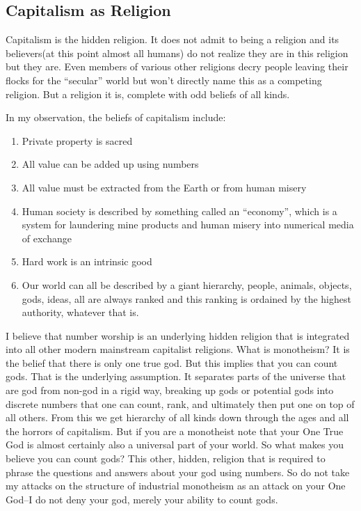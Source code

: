 \subsection{Capitalism as Religion}\label{capitalism-as-religion}

Capitalism is the hidden religion. It does not admit to being a religion
and its believers(at this point almost all humans) do not realize they
are in this religion but they are. Even members of various other
religions decry people leaving their flocks for the ``secular'' world
but won't directly name this as a competing religion. But a religion it
is, complete with odd beliefs of all kinds.

In my observation, the beliefs of capitalism include:

\begin{enumerate}
\def\labelenumi{\arabic{enumi}.}
\tightlist
\item
  Private property is sacred
\item
  All value can be added up using numbers
\item
  All value must be extracted from the Earth or from human misery
\item
  Human society is described by something called an ``economy'', which
  is a system for laundering mine products and human misery into
  numerical media of exchange
\item
  Hard work is an intrinsic good
\item
  Our world can all be described by a giant hierarchy, people, animals,
  objects, gods, ideas, all are always ranked and this ranking is
  ordained by the highest authority, whatever that is.
\end{enumerate}

I believe that number worship is an underlying hidden religion that is
integrated into all other modern mainstream capitalist religions. What
is monotheism? It is the belief that there is only one true god. But
this implies that you can count gods. That is the underlying assumption.
It separates parts of the universe that are god from non-god in a rigid
way, breaking up gods or potential gods into discrete numbers that one
can count, rank, and ultimately then put one on top of all others. From
this we get hierarchy of all kinds down through the ages and all the
horrors of capitalism. But if you are a monotheist note that your One
True God is almost certainly also a universal part of your world. So
what makes you believe you can count gods? This other, hidden, religion
that is required to phrase the questions and answers about your god
using numbers. So do not take my attacks on the structure of industrial
monotheism as an attack on your One God--I do not deny your god, merely
your ability to count gods.

